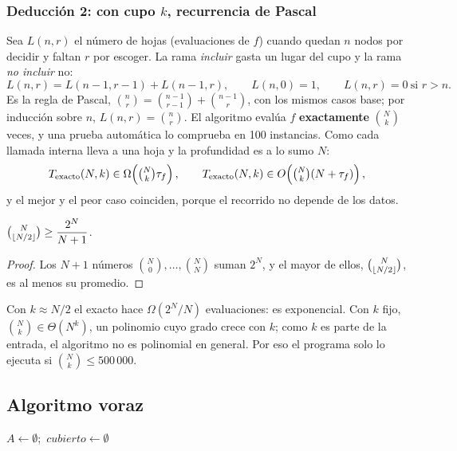 \subsubsection*{Deducción 2: con cupo $k$, recurrencia de Pascal}

Sea $L(n,r)$ el número de hojas (evaluaciones de $f$) cuando quedan $n$ nodos por decidir y faltan
$r$ por escoger. La rama \emph{incluir} gasta un lugar del cupo y la rama \emph{no incluir} no:
\[
  L(n,r)=L(n-1,r-1)+L(n-1,r),\qquad L(n,0)=1,\qquad L(n,r)=0\ \text{si } r>n .
\]
Es la regla de Pascal, $\binom{n}{r}=\binom{n-1}{r-1}+\binom{n-1}{r}$, con los mismos casos base; por
inducción sobre $n$, $L(n,r)=\binom{n}{r}$. El algoritmo evalúa $f$ \textbf{exactamente}
$\binom{N}{k}$ veces, y una prueba automática lo comprueba en 100 instancias. Como cada llamada interna lleva a una hoja y la profundidad es a lo sumo $N$:
\[
  T_{\text{exacto}}(N,k)\in\Omega\!\left(\tbinom{N}{k}\tau_f\right),\qquad
  T_{\text{exacto}}(N,k)\in O\!\left(\tbinom{N}{k}(N+\tau_f)\right),
\]
y el mejor y el peor caso coinciden, porque el recorrido no depende de los datos.

\begin{lema}
$\binom{N}{\lfloor N/2\rfloor}\ge \dfrac{2^N}{N+1}$.
\end{lema}
\begin{proof}
Los $N+1$ números $\binom{N}{0},\dots,\binom{N}{N}$ suman $2^N$, y el mayor de ellos,
$\binom{N}{\lfloor N/2\rfloor}$, es al menos su promedio.
\end{proof}

\noindent Con $k\approx N/2$ el exacto hace $\Omega(2^N/N)$ evaluaciones: es exponencial. Con $k$
fijo, $\binom{N}{k}\in\Theta(N^k)$, un polinomio cuyo grado crece con $k$; como $k$ es parte de la
entrada, el algoritmo no es polinomial en general. Por eso el programa solo lo ejecuta si
$\binom{N}{k}\le 500\,000$.

\subsection{Algoritmo voraz}

\begin{algorithm}[H]
\caption{\textsc{SelecciónVoraz}$(S_1,\dots,S_N,\ k)$ — \texttt{seleccion\_voraz}}\label{alg:voraz}
$A\leftarrow\emptyset$;\ $\mathit{cubierto}\leftarrow\emptyset$\;
\;
\end{algorithm}

